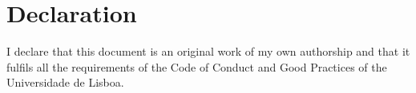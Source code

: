 \chapter*{Declaration}

I declare that this document is an original work of my own authorship and that 
it fulfils all the requirements of the Code of Conduct and Good Practices of the 
Universidade de Lisboa.
\clearpage
\thispagestyle{empty}
\cleardoublepage

